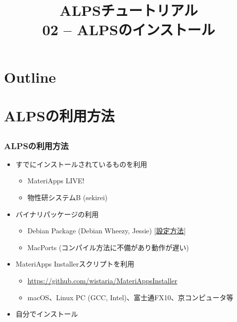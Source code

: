 
\title{ALPSチュートリアル \\ 02 -- ALPSのインストール}



\begin{frame}
  \titlepage
\end{frame}

\section*{Outline}
\begin{frame}
  \tableofcontents
\end{frame}

\section{ALPSの利用方法}

\subsection*{\redb\whiteb\greenb}
\begin{frame}[fragile]
  \frametitle{ALPSの利用方法}
  \begin{itemize}
    \setlength{\itemsep}{1em}
  \item すでにインストールされているものを利用
    \begin{itemize}
    \item MateriApps LIVE!
    \item 物性研システムB (sekirei)
    \end{itemize}
  \item バイナリパッケージの利用
    \begin{itemize}
    \item Debian Package (Debian Wheezy, Jessie) [\href{https://github.com/cmsi/MateriAppsLive/wiki/UsingMateriAppsInDebian}{設定方法}]
    \item MacPorts (コンパイル方法に不備があり動作が遅い)
    \end{itemize}
  \item MateriApps Installerスクリプトを利用
    \begin{itemize}
    \item \url{https://github.com/wistaria/MateriAppsInstaller}
    \item macOS、Linux PC (GCC, Intel)、富士通FX10、京コンピュータ等
    \end{itemize}
  \item 自分でインストール
  \end{itemize}
\end{frame}

